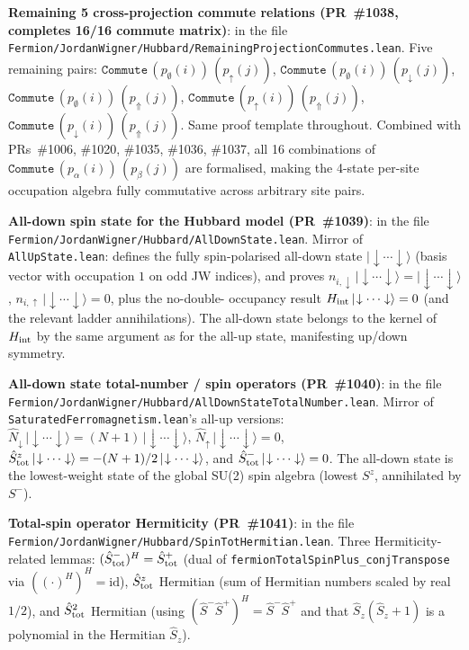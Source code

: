 \documentclass[a4paper,11pt]{article}
\begin{document}
\textbf{Remaining 5 cross-projection commute relations (PR~\#1038,
completes 16/16 commute matrix)}: in the file
\texttt{Fermion/JordanWigner/Hubbard/RemainingProjectionCommutes.lean}.
Five remaining pairs:
$\texttt{Commute}\,(p_\emptyset(i))\,(p_\uparrow(j))$,
$\texttt{Commute}\,(p_\emptyset(i))\,(p_\downarrow(j))$,
$\texttt{Commute}\,(p_\emptyset(i))\,(p_\Uparrow(j))$,
$\texttt{Commute}\,(p_\uparrow(i))\,(p_\Uparrow(j))$,
$\texttt{Commute}\,(p_\downarrow(i))\,(p_\Uparrow(j))$.
Same proof template throughout. Combined with PRs~\#1006,
\#1020, \#1035, \#1036, \#1037, all 16 combinations of
$\texttt{Commute}\,(p_\alpha(i))\,(p_\beta(j))$ are formalised,
making the 4-state per-site occupation algebra fully commutative
across arbitrary site pairs.

\textbf{All-down spin state for the Hubbard model (PR~\#1039)}:
in the file
\texttt{Fermion/JordanWigner/Hubbard/AllDownState.lean}. Mirror
of \texttt{AllUpState.lean}: defines the fully spin-polarised
all-down state $|\!\downarrow\cdots\downarrow\rangle$ (basis
vector with occupation $1$ on odd JW indices), and proves
$n_{i,\downarrow}\,|\!\downarrow\cdots\downarrow\rangle =
|\!\downarrow\cdots\downarrow\rangle$, $n_{i,\uparrow}\,
|\!\downarrow\cdots\downarrow\rangle = 0$, plus the no-double-
occupancy result $H_{\rm int}\,|\!\downarrow\cdots\downarrow
\rangle = 0$ (and the relevant ladder annihilations). The
all-down state belongs to the kernel of $H_{\rm int}$ by the
same argument as for the all-up state, manifesting up/down
symmetry.

\textbf{All-down state total-number / spin operators (PR~\#1040)}:
in the file
\texttt{Fermion/JordanWigner/Hubbard/AllDownStateTotalNumber.lean}.
Mirror of \texttt{SaturatedFerromagnetism.lean}'s all-up
versions: $\hat N_\downarrow\,|\!\downarrow\cdots\downarrow
\rangle = (N+1)\,|\!\downarrow\cdots\downarrow\rangle$,
$\hat N_\uparrow\,|\!\downarrow\cdots\downarrow\rangle = 0$,
$\hat S^z_{\rm tot}\,|\!\downarrow\cdots\downarrow\rangle =
-(N+1)/2\,|\!\downarrow\cdots\downarrow\rangle$, and
$\hat S^-_{\rm tot}\,|\!\downarrow\cdots\downarrow\rangle = 0$.
The all-down state is the lowest-weight state of the global
SU(2) spin algebra (lowest $S^z$, annihilated by $S^-$).

\textbf{Total-spin operator Hermiticity (PR~\#1041)}: in the
file
\texttt{Fermion/JordanWigner/Hubbard/SpinTotHermitian.lean}.
Three Hermiticity-related lemmas: $(\hat S^-_{\rm tot})^H =
\hat S^+_{\rm tot}$ (dual of \texttt{fermionTotalSpinPlus\_conjTranspose}
via $((\cdot)^H)^H = \mathrm{id}$), $\hat S^z_{\rm tot}$
Hermitian (sum of Hermitian numbers scaled by real $1/2$),
and $\hat S^2_{\rm tot}$ Hermitian (using $(\hat S^- \hat S^+)^H =
\hat S^- \hat S^+$ and that $\hat S_z(\hat S_z + 1)$ is a
polynomial in the Hermitian $\hat S_z$).
\end{document}
